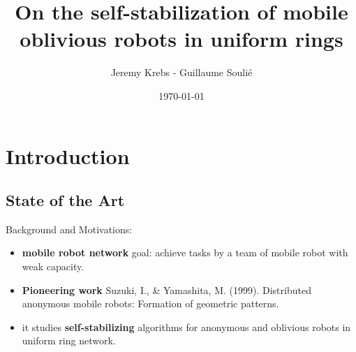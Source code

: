 \documentclass{beamer}
\title{On the self-stabilization of mobile oblivious robots in uniform rings}
\author{Jeremy Krebs - Guillaume Soulié}
\institute{Université Paris Saclay}
\date{\today}
\begin{document}
\begin{frame}
\titlepage
\end{frame}

\begin{frame}
  \tableofcontents
\end{frame}      



\section{Introduction}

\subsection{State of the Art}
\begin{frame}
	Background and Motivations:
	\begin{itemize}
		\pause
		\item \textbf{mobile robot network} goal: achieve tasks by a team of 
		mobile robot with weak capacity. 
		\pause
		\item \textbf{Pioneering work} Suzuki, I., \& Yamashita, M. (1999). Distributed anonymous mobile robots: Formation of geometric patterns.
		\pause
		\item it studies \textbf{self-stabilizing} algorithms for anonymous and oblivious robots in uniform ring network.
	\end{itemize}
\end{frame}
\end{document}
